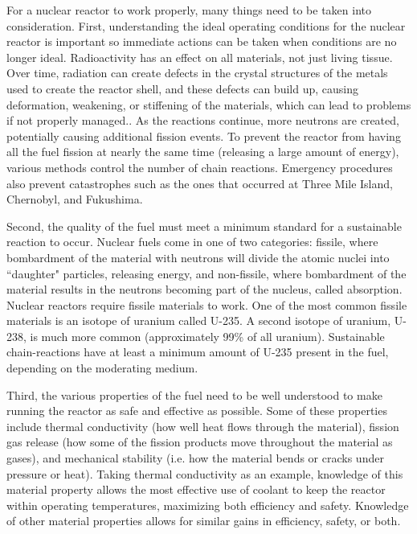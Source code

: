 \documentclass[twoside,senior]{BYUPhys}
\begin{document}
For a nuclear reactor to work properly, many things need to be taken into consideration.  First, understanding the ideal operating conditions for the nuclear reactor is important so immediate actions can be taken when conditions are no longer ideal.  Radioactivity has an effect on all materials, not just living tissue.  Over time, radiation can create defects in the crystal structures of the metals used to create the reactor shell, and these defects can build up, causing deformation, weakening, or stiffening of the materials, which can lead to problems if not properly managed.\cite{callister2003}.  As the reactions continue, more neutrons are created, potentially causing additional fission events.  To prevent the reactor from having all the fuel fission at nearly the same time (releasing a large amount of energy), various methods control the number of chain reactions.  Emergency procedures also prevent catastrophes such as the ones that occurred at Three Mile Island, Chernobyl, and Fukushima.

Second, the quality of the fuel must meet a minimum standard for a sustainable reaction to occur.  Nuclear fuels come in one of two categories: fissile, where bombardment of the material with neutrons will divide the atomic nuclei into ``daughter" particles, releasing energy, and non-fissile, where bombardment of the material results in the neutrons becoming part of the nucleus, called absorption.  Nuclear reactors require fissile materials to work.  One of the most common fissile materials is an isotope of uranium called U-235.  A second isotope of uranium, U-238, is much more common (approximately 99\% of all uranium).  Sustainable chain-reactions have at least a minimum amount of U-235 present in the fuel, depending on the moderating medium.\cite{uraniumInfo}

Third, the various properties of the fuel need to be well understood to make running the reactor as safe and effective as possible.  Some of these properties include thermal conductivity (how well heat flows through the material), fission gas release (how some of the fission products move throughout the material as gases), and mechanical stability (i.e. how the material bends or cracks under pressure or heat).  Taking thermal conductivity as an example, knowledge of this material property allows the most effective use of coolant to keep the reactor within operating temperatures, maximizing both efficiency and safety.  Knowledge of other material properties allows for similar gains in efficiency, safety, or both.
\end{document}
